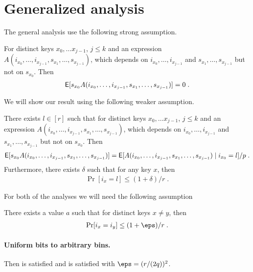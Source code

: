 \section{Generalized analysis}

The general analysis use the following strong assumption.
\begin{assumption}\label{ass:independence}
    For distinct keys $x_0, \ldots x_{j - 1}$, $j \le k$
    and an expression $A(i_{x_0}, \ldots, i_{x_{j - 1}}, s_{x_1}, \ldots, s_{x_{j - 1}})$,
    which depends on $i_{x_0}, \ldots, i_{x_{j - 1}}$ and $s_{x_1}, \ldots, s_{x_{j - 1}}$
    but not on $s_{x_0}$. Then
    \begin{align}
        \operatorname*{\sf{E}}[s_{x_0} A(i_{x_0}, \ldots, i_{x_{j - 1}}, s_{x_1}, \ldots, s_{x_{j - 1}})] = 0\; .
    \end{align}
\end{assumption}
We will show our result using the following weaker assumption.
\begin{assumption}\label{ass:near-independence}
    There exists $l \in [r]$ such that for distinct keys $x_0, \ldots x_{j - 1}$, $j \le k$
    and an expression $A(i_{x_0}, \ldots, i_{x_{j - 1}}, s_{x_1}, \ldots, s_{x_{j - 1}})$,
    which depends on $i_{x_0}, \ldots, i_{x_{j - 1}}$ and $s_{x_1}, \ldots, s_{x_{j - 1}}$
    but not on $s_{x_0}$. Then
    \begin{align}\label{eq:near-independence}
        \operatorname*{\sf{E}}[s_{x_0} A(i_{x_0}, \ldots, i_{x_{j - 1}}, s_{x_1}, \ldots, s_{x_{j - 1}})]
            = \operatorname*{\sf{E}}[A(i_{x_0}, \ldots, i_{x_{j - 1}}, s_{x_1}, \ldots, s_{x_{j - 1}}) \mid i_{x_0} = l]/p \; .
    \end{align}
    Furthermore, there exists $\delta$ such that for any key $x$, then
    \begin{align}\label{eq:prob-special-value}
        \Pr[i_x = l] \le (1 + \delta)/r \; .
    \end{align}
\end{assumption}

For both of the analyses we will need the following assumption
\begin{assumption}\label{ass:collision}
    There exists a value $a$ such that for distinct keys $x \neq y$,
    then
    \begin{align}\label{eq:collision}
        \Pr[i_x = i_y] \le (1 + \eps)/r\; .
    \end{align}
\end{assumption}

\paragraph{Uniform bits to arbitrary bins.}
Then  is satisfied and  is
satisfied with $\eps = (r/(2q))^2$.

